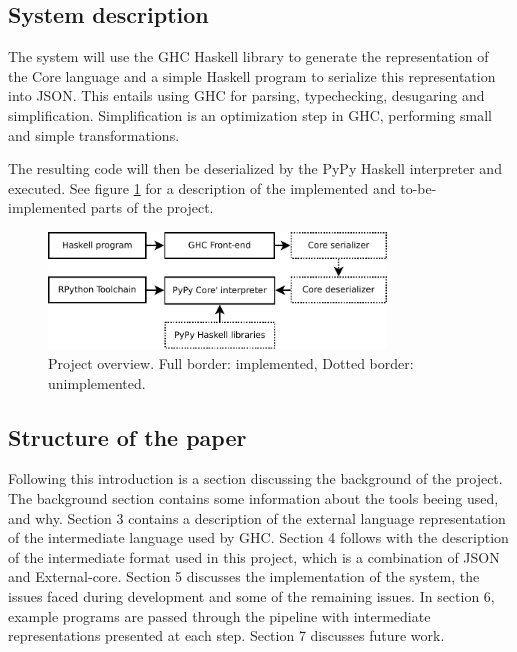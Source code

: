 \subsection{System description}

The system will use the GHC Haskell library to generate the 
representation of the Core language and a simple Haskell program to 
serialize this representation into JSON. This entails using GHC for
parsing, typechecking, desugaring and simplification. Simplification
is an optimization step in GHC, performing small and simple transformations.

The resulting code will then be deserialized by the PyPy Haskell interpreter 
and executed. See figure \ref{overview} for a description of the implemented and
to-be-implemented parts of the project.

\begin{figure}[H]
\centering
\includegraphics[width=0.8\textwidth]{diags/overview}
\caption[Project overview]{Project overview. Full border: implemented, Dotted border: unimplemented.}
\label{overview}
\end{figure}

\subsection{Structure of the paper}

Following this introduction is a section discussing the 
background of the project. The background section contains some information 
about the tools beeing used, and why.
Section 3 contains a description of the external language representation
of the intermediate language used by GHC.
Section 4 follows with the description of 
the intermediate format
used in this project, which is a combination of JSON and External-core.
Section 5 discusses the implementation of the system, the issues faced
during development and some of the remaining issues.
In section 6, example programs are passed through the pipeline 
with intermediate representations presented at each step.
Section 7 discusses future work.


